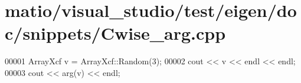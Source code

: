 \hypertarget{matio_2visual__studio_2test_2eigen_2doc_2snippets_2_cwise__arg_8cpp_source}{}\section{matio/visual\+\_\+studio/test/eigen/doc/snippets/\+Cwise\+\_\+arg.cpp}
\label{matio_2visual__studio_2test_2eigen_2doc_2snippets_2_cwise__arg_8cpp_source}

\begin{DoxyCode}
00001 ArrayXcf v = ArrayXcf::Random(3);
00002 cout << v << endl << endl;
00003 cout << arg(v) << endl;
\end{DoxyCode}
